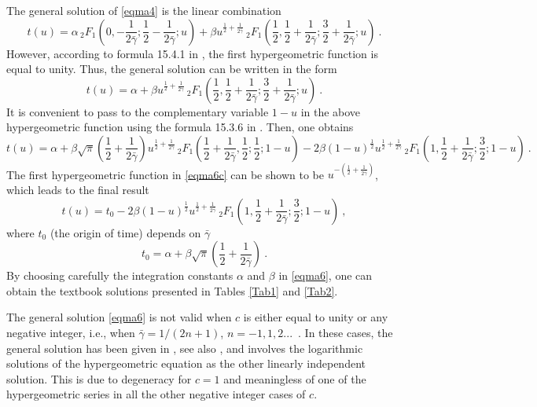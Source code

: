\documentclass[
showkeys,
preprintnumbers,amsmath,amssymb,APS]{revtex4}
\begin{document}
The general solution of \eqref{eqma4} is the linear combination
\begin{equation}\label{eqma6b}
t(u)=\alpha \, {}_2F_1\left(0,-\frac{1}{2 \bar \gamma};\frac 12-\frac{1}{2 \bar \gamma};u\right)+\beta
u^{\frac 1 2+\frac{1}{2 \bar \gamma}}\, {}_2F_1\left (\frac 1 2,\frac 1 2+\frac{1}{2 \bar \gamma};\frac 32+\frac{1}{2 \bar \gamma};u\right)~.
\end{equation}
However, according to formula 15.4.1 in \cite{AS}, the first hypergeometric function is equal to unity. Thus, the general solution can be written in the form
\begin{equation}\label{eqma6a}
t(u)=\alpha+\beta u^{\frac 1 2+\frac{1}{2 \bar \gamma}}\, {}_2F_1\left (\frac 1 2,\frac 1 2+\frac{1}{2 \bar \gamma};\frac 32+\frac{1}{2 \bar \gamma};u\right)~.
\end{equation}
It is convenient to pass to the complementary variable $1-u$ in the above hypergeometric function using the formula 15.3.6 in \cite{AS}.
Then, one obtains
\begin{equation}\label{eqma6c}
t(u)=\alpha+\beta \sqrt{\pi}\left(\frac 1 2+\frac{1}{2 \bar \gamma}\right) u^{\frac 1 2+\frac{1}{2 \bar \gamma}}\, {}_2F_1\left(\frac 1 2+\frac{1}{2 \bar \gamma},\frac 12;\frac 12;1-u\right)-2\beta (1-u)^{\frac 12} u^{\frac 1 2+\frac{1}{2 \bar \gamma}}\, {}_2F_1\left (1,\frac 1 2+\frac{1}{2 \bar \gamma};\frac 32;1-u\right)~.
\end{equation}
The first hypergeometric function in \eqref{eqma6c} can be shown to be $u^{-(\frac 1 2+\frac{1}{2 \bar \gamma})}$, which leads to the final result
\begin{equation}\label{eqma6}
t(u)=t_0-2\beta (1-u)^{\frac 12} u^{\frac 1 2+\frac{1}{2 \bar \gamma}}\, {}_2F_1\left (1,\frac 1 2+\frac{1}{2 \bar \gamma};\frac 32;1-u\right)~,
\end{equation}
where $t_0$ (the origin of time) depends on $\bar \gamma$
\begin{equation}\label{eqma6-1}
t_0=\alpha+\beta \sqrt{\pi}\left(\frac 1 2+\frac{1}{2 \bar \gamma}\right)~.
\end{equation}
By choosing carefully the integration constants $\alpha$ and $\beta$ in \eqref{eqma6}, one can obtain the textbook solutions presented in Tables \ref{Tab1} and \ref{Tab2}.

The general solution \eqref{eqma6} is not valid when $c$ is either equal to unity or any negative integer, i.e., when $\bar \gamma = 1/(2n+1)$, $n=-1,1,2...$~. In these cases, the general solution has been given in \cite{nor}, see also \cite{Lima}, and involves the logarithmic solutions of the hypergeometric equation as the other linearly independent solution. This is due to degeneracy for $c=1$ and meaningless of one of the hypergeometric series in all the other negative integer cases of $c$.
\end{document}
